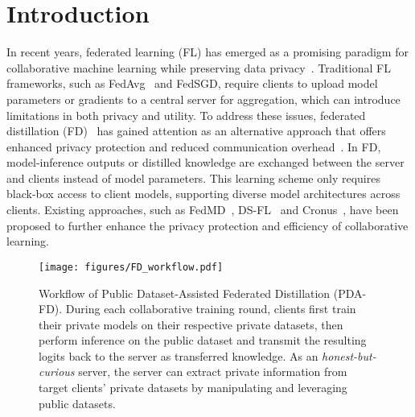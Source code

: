 \section{Introduction}
In recent years, federated learning (FL) has emerged as a promising paradigm for collaborative machine learning while preserving data privacy~\cite{mcmahan2017communication}.
Traditional FL frameworks, such as FedAvg~\cite{mcmahan2017communication} and FedSGD, require clients to upload model parameters or gradients to a central server for aggregation, which can introduce limitations in both privacy and utility.
To address these issues, federated distillation (FD)~\cite{li2019fedmd, sui2020feded, itahara2021distillation, chang2019cronus, jeong2018communication} has gained attention as an alternative approach that offers enhanced privacy protection and reduced communication overhead~\cite{wu2022communication,huang2023decentralized}.
In FD, model-inference outputs or distilled knowledge are exchanged between the server and clients instead of model parameters.
This learning scheme only requires black-box access to client models, supporting diverse model architectures across clients.
Existing approaches, such as FedMD~\cite{li2019fedmd}, DS-FL~\cite{itahara2021distillation} and Cronus~\cite{chang2019cronus}, have been proposed to further enhance the privacy protection and efficiency of collaborative learning.

\begin{figure}
    \centering
    \texttt{[image: figures/FD\_workflow.pdf]}
    \caption{Workflow of Public Dataset-Assisted Federated Distillation (PDA-FD). During each collaborative training round, clients first train their private models on their respective private datasets, then perform inference on the public dataset and transmit the resulting logits back to the server as transferred knowledge. As an \textit{honest-but-curious} server, the server can extract private information from target clients' private datasets by manipulating and leveraging public datasets.}
    \label{fig:FD_workflow}
\end{figure}

